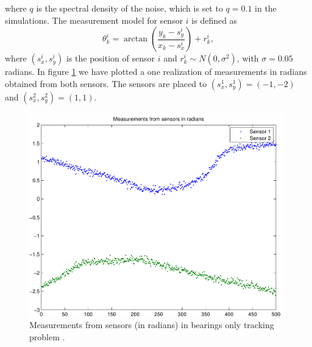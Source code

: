 %
where $q$ is the spectral density of the noise, which is set to
$q=0.1$ in the simulations. The measurement model for sensor $i$ is
defined as
%
\begin{equation}
%
\theta^i_k = \arctan \left( \frac{y_k - s^i_y}{x_k - s^i_x}\right) +
r^i_k,
%
\end{equation}
%
where $(s^i_x,s^i_y)$ is the position of sensor $i$ and $r^i_k \sim
N(0,\sigma^2)$, with $\sigma = 0.05$ radians. In figure
\ref{fig:bot_measurements} we have plotted a one realization of
measurements in radians obtained from both sensors. The sensors are
placed to $(s^1_x,s^1_y) = (-1,-2)$ and $(s^2_x,s^2_y) = (1,1)$.
%
\begin{figure}
\begin{center}
\includegraphics[width=11cm]{pics/bot_demo_measurements}
\caption{Measurements from sensors (in radians) in bearings only
tracking problem .}
\label{fig:bot_measurements}
\end{center}
\end{figure}

